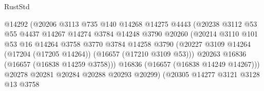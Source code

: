\begin{lexlean}{RustStd}
\begin{coremodule}
                                      @14292
                                      (@20206
                                        @3113
                                        @735
                                        @140
                                        @14268
                                        @14275
                                        @4443
                                        (@20238
                                          @3112
                                          @53
                                          @55
                                          @4437
                                          @14267
                                          @14274
                                          @3784
                                          @14248
                                          @3790
                                          @20260
                                          (@20214
                                            @3110
                                            @101
                                            @53
                                            @16
                                            @14264
                                            @3758
                                            @3770
                                            @3784
                                            @14258
                                            @3790
                                            (@20227
                                              @3109
                                              @14264
                                              (@17204 (@17205 @14264))
                                              (@16657 (@17210 @3109 @53)))
                                            @20263
                                            @16836
                                            (@16657 (@16838 @14259 @3758)))
                                          @16836
                                          (@16657 (@16838 @14249 @14267)))
                                        @20278
                                        @20281
                                        @20284
                                        @20288
                                        @20293
                                        @20299)
                                      (@20305
                                        @14277
                                        @3121
                                        @3128
                                        @13
                                        @3758

\end{coremodule}
\end{lexlean}
